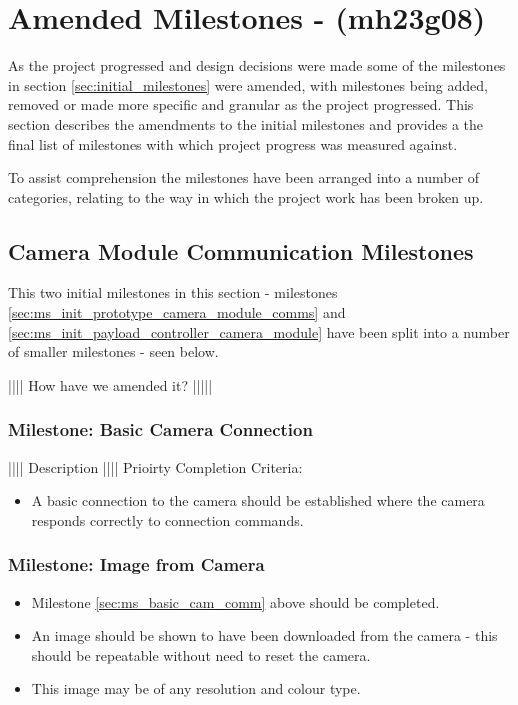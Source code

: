 
\section{Amended Milestones - (mh23g08)}
\label{sec:amended_milestones}
As the project progressed and design decisions were made some of the milestones in section
\ref{sec:initial_milestones} were amended, with milestones being added, removed or made more
specific and granular as the project progressed. This section describes the amendments to the
initial milestones and provides a the final list of milestones with which project progress was measured
against.

To assist comprehension the milestones have been arranged into a number of categories,
relating to the way in which the project work has been broken up. 

\subsection{Camera Module Communication Milestones}
This two initial milestones in this section - milestones \ref{sec:ms_init_prototype_camera_module_comms}
and \ref{sec:ms_init_payload_controller_camera_module}  have been split into a number of smaller
milestones - seen below.

|||| How have we amended it? |||||

	\subsubsection{Milestone: Basic Camera Connection}
		|||| Description ||||
		Prioirty
		Completion Criteria:
		\label{sec:ms_basic_cam_comm}
		\begin{itemize}
			\item 	A basic connection to the camera should be established
				where the camera responds correctly to connection 
				commands.
		\end{itemize}
	
	\subsubsection{Milestone: Image from Camera}
		\label{sec:ms_img_from_cam}
		\begin{itemize}
			\item 	Milestone \ref{sec:ms_basic_cam_comm} above should
				be completed.
			\item 	An image should be shown to have been downloaded 
				from the camera - this should be repeatable without
				need to reset the camera.
			\item 	This image may be of any resolution and colour type.
		\end{itemize} 

